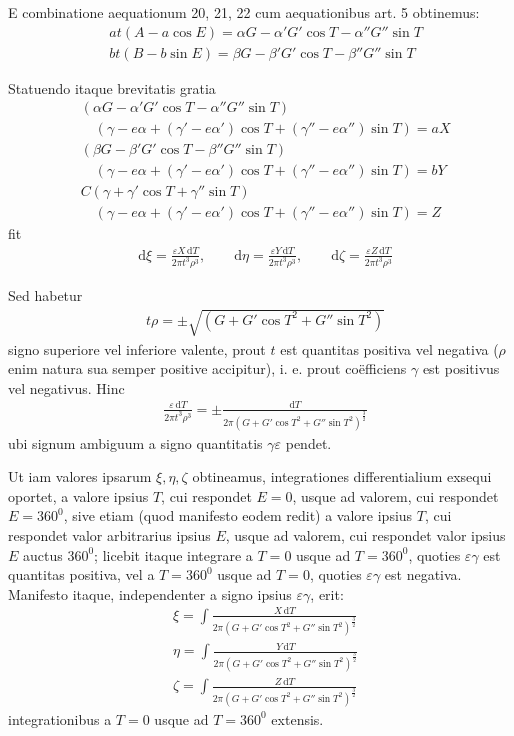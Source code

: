 E combinatione aequationum 20, 21, 22 cum aequationibus art. 5 obtinemus:
\[
\begin{aligned}
&at(A-a\cos E)=\alpha G-\alpha'G'\cos T-\alpha''G''\sin T\\[8pt]
&bt(B-b\sin E)=\beta G-\beta'G'\cos T-\beta''G''\sin T
\end{aligned}
\]
\par Statuendo itaque brevitatis gratia
\[
\begin{aligned}
&(\alpha G-\alpha'G'\cos T-\alpha''G''\sin T)\\[8pt]
&\quad(\gamma-e\alpha+(\gamma'-e\alpha')\cos T+(\gamma''-e\alpha'')\sin T)=aX\\[8pt]
&(\beta G-\beta'G'\cos T-\beta''G''\sin T)\\[8pt]
&\quad(\gamma-e\alpha+(\gamma'-e\alpha')\cos T+(\gamma''-e\alpha'')\sin T)=bY\\[8pt]
&C(\gamma+\gamma'\cos T+\gamma''\sin T)\\[8pt]
&\quad(\gamma-e\alpha+(\gamma'-e\alpha')\cos T+(\gamma''-e\alpha'')\sin T)=Z
\end{aligned}
\]
fit
\[
\begin{aligned}
&\mathrm d\xi=\frac{\varepsilon X\,\mathrm dT}{2\pi t^3\rho^3},\qquad
\mathrm d\eta=\frac{\varepsilon Y\,\mathrm dT}{2\pi t^3\rho^3},\qquad
\mathrm d\zeta=\frac{\varepsilon Z\,\mathrm dT}{2\pi t^3\rho^3}
\end{aligned}
\]
\par Sed habetur
\[
\begin{aligned}
&t\rho=\pm\surd{(G+G'\cos T^2+G''\sin T^2)}
\end{aligned}
\]
signo superiore vel inferiore valente, prout $t$ est quantitas positiva vel negativa
($\rho$ enim natura sua semper positive accipitur), i. e. prout coëfficiens $\gamma$ est positivus vel negativus. Hinc
\[
\begin{aligned}
&\frac{\varepsilon\,\mathrm dT}{2\pi t^3\rho^3}
=\pm\frac{\mathrm dT}{2\pi(G+G'\cos T^2+G''\sin T^2)^{\frac32}}
\end{aligned}
\]
ubi signum ambiguum a signo quantitatis $\gamma\varepsilon$ pendet.

Ut iam valores ipsarum $\xi,\eta,\zeta$ obtineamus, integrationes differentialium exsequi oportet,
a valore ipsius $T$, cui respondet $E=0$, usque ad valorem, cui respondet $E=360^0$,
sive etiam (quod manifesto eodem redit) a valore ipsius $T$, cui respondet valor arbitrarius ipsius $E$,
usque ad valorem, cui respondet valor ipsius $E$ auctus $360^0$;
licebit itaque integrare a $T=0$ usque ad $T=360^0$, quoties $\varepsilon\gamma$ est quantitas positiva,
vel a $T=360^0$ usque ad $T=0$, quoties $\varepsilon\gamma$ est negativa.
Manifesto itaque, independenter a signo ipsius $\varepsilon\gamma$, erit:
\[
\begin{aligned}
&\xi=\int\frac{X\,\mathrm dT}{2\pi(G+G'\cos T^2+G''\sin T^2)^{\frac32}}\\[8pt]
&\eta=\int\frac{Y\,\mathrm dT}{2\pi(G+G'\cos T^2+G''\sin T^2)^{\frac32}}\\[8pt]
&\zeta=\int\frac{Z\,\mathrm dT}{2\pi(G+G'\cos T^2+G''\sin T^2)^{\frac32}}
\end{aligned}
\]
integrationibus a $T=0$ usque ad $T=360^0$ extensis.

